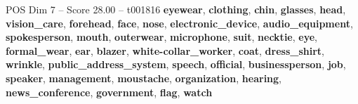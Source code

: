 \begin{textsample}{POS Dim 7 – Score 28.00 – t001816}  \label{ex:f7_pos_019}
\textbf{eyewear}, \textbf{clothing}, \textbf{chin}, \textbf{glasses}, \textbf{head}, \textbf{vision\_care}, \textbf{forehead}, \textbf{face}, \textbf{nose}, \textbf{electronic\_device}, \textbf{audio\_equipment}, \textbf{spokesperson}, \textbf{mouth}, \textbf{outerwear}, \textbf{microphone}, \textbf{suit}, \textbf{necktie}, \textbf{eye}, \textbf{formal\_wear}, \textbf{ear}, \textbf{blazer}, \textbf{white-collar\_worker}, \textbf{coat}, \textbf{dress\_shirt}, \textbf{wrinkle}, \textbf{public\_address\_system}, \textbf{speech}, \textbf{official}, \textbf{businessperson}, \textbf{job}, \textbf{speaker}, \textbf{management}, \textbf{moustache}, \textbf{organization}, \textbf{hearing}, \textbf{news\_conference}, \textbf{government}, \textbf{flag}, \textbf{watch}

\end{textsample}
